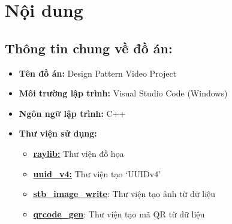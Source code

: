 \section{Nội dung}
\subsection{Thông tin chung về đồ án:}
\begin{itemize}
  \item \textbf{Tên đồ án:} Design Pattern Video Project
  \item \textbf{Môi trường lập trình:} Visual Studio Code (Windows)
  \item \textbf{Ngôn ngữ lập trình:} C++
  \item \textbf{Thư viện sử dụng:}
        \begin{itemize}
          \item \href{https://www.raylib.com/}{\textbf{raylib:}} Thư viện đồ họa
          \item \href{https://github.com/crashoz/uuid_v4}{\textbf{uuid\_v4:}} Thư viện tạo `UUIDv4'
          \item \href{https://github.com/nothings/stb/blob/master/stb_image_write.h}{\textbf{stb\_image\_write}}: Thư viện tạo ảnh từ dữ liệu
          \item \href{https://github.com/nayuki/QR-Code-generator}{\textbf{qrcode\_gen}}: Thư viện tạo mã QR từ dữ liệu
        \end{itemize}
\end{itemize}
